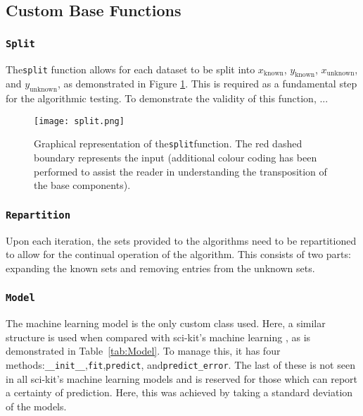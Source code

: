 \subsection{Custom Base Functions}
\subsubsection{\lstinline{Split}}
The\lstinline{split} function allows for each dataset to be split into $x_\mathrm{known}$, $y_\mathrm{known}$, $x_\mathrm{unknown}$, and $y_\mathrm{unknown}$, as demonstrated in Figure \ref{fig:Split}. This is required as a fundamental step for the algorithmic testing. To demonstrate the validity of this function, ...

\begin{figure}
    \begin{center}
        \texttt{[image: split.png]}
    \end{center}
    \caption[Representation of the split function]{Graphical representation of the\lstinline{split}function. The red dashed boundary represents the input (additional colour coding has been performed to assist the reader in understanding the transposition of the base components).}
    \label{fig:Split}
\end{figure}


\subsubsection{\lstinline{Repartition}}
Upon each iteration, the sets provided to the algorithms need to be repartitioned to allow for the continual operation of the algorithm. This consists of two parts: expanding the known sets and removing entries from the unknown sets.
\\
\subsubsection{\lstinline{Model}}
The machine learning model is the only custom class used. Here, a similar structure is used when compared with sci-kit's machine learning \cite{scikit}, as is demonstrated in Table~\ref{tab:Model}. To manage this, it has four methods:\lstinline{__init__},\lstinline{fit},\lstinline{predict}, and\lstinline{predict_error}. The last of these is not seen in all sci-kit's machine learning models and is reserved for those which can report a certainty of prediction. Here, this was achieved by taking a standard deviation of the models.

